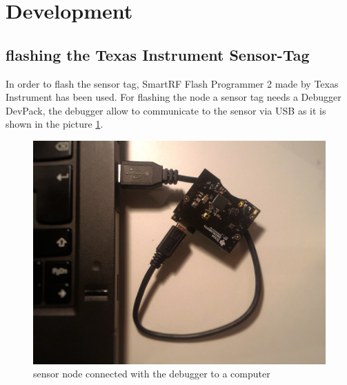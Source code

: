 \section{Development}
\subsection{flashing the Texas Instrument Sensor-Tag}
In order to flash the sensor tag, SmartRF Flash Programmer 2 made by Texas Instrument has been used. For flashing the node a sensor tag needs a Debugger DevPack, the debugger allow to communicate to the sensor via USB as it is shown in the picture \ref{fig:debugger}. 
\begin{figure}[!h]
	\includegraphics[width=\linewidth]{debugger}
	\caption{sensor node connected with the debugger to a computer}
	\label{fig:debugger}
\end{figure}